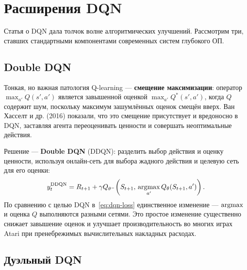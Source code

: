 \section{Расширения DQN}
\label{sec:dqn-extensions}

Статья о DQN дала толчок волне алгоритмических улучшений.  Рассмотрим три, ставших стандартными компонентами современных систем глубокого ОП.

\subsection{Double DQN}
\label{subsec:double-dqn}

Тонкая, но важная патология Q-learning --- \textbf{смещение максимизации}: оператор $\max_{a'} Q(s', a')$ является завышенной оценкой $\max_{a'} Q^*(s', a')$, когда $Q$ содержит шум, поскольку максимум зашумлённых оценок смещён вверх.  Ван Хасселт и др. (2016) показали, что это смещение присутствует и вредоносно в DQN, заставляя агента переоценивать ценности и совершать неоптимальные действия.

Решение --- \textbf{Double DQN} (DDQN): разделить выбор действия и оценку ценности, используя онлайн-сеть для выбора жадного действия и целевую сеть для его оценки:
\begin{equation}
\label{eq:ddqn-target}
y_t^{\mathrm{DDQN}} = R_{t+1} + \gamma Q_{\theta^-}\!\left(S_{t+1},\, \operatorname*{argmax}_{a'} Q_\theta(S_{t+1}, a')\right).
\end{equation}
По сравнению с целью DQN в~\eqref{eq:dqn-loss} единственное изменение --- $\operatorname*{argmax}$ и оценка $Q$ выполняются разными сетями.  Это простое изменение существенно снижает завышение оценок и улучшает производительность во многих играх Atari при пренебрежимых вычислительных накладных расходах.

\subsection{Дуэльный DQN}
\label{subsec:dueling-dqn}

